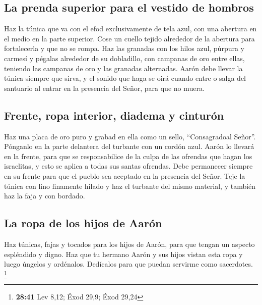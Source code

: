 \hypertarget{la-prenda-superior-para-el-vestido-de-hombros}{%
\subsection{La prenda superior para el vestido de
hombros}\label{la-prenda-superior-para-el-vestido-de-hombros}}

 Haz la túnica que va con el efod exclusivamente de tela
azul,  con una abertura en el medio en la parte superior.
Cose un cuello tejido alrededor de la abertura para fortalecerla y que
no se rompa.  Haz las granadas con los hilos azul,
púrpura y carmesí y pégalas alrededor de su dobladillo, con campanas de
oro entre ellas,  teniendo las campanas de oro y las
granadas alternadas.  Aarón debe llevar la túnica siempre
que sirva, y el sonido que haga se oirá cuando entre o salga del
santuario al entrar en la presencia del Señor, para que no muera.

\hypertarget{frente-ropa-interior-diadema-y-cinturuxf3n}{%
\subsection{Frente, ropa interior, diadema y
cinturón}\label{frente-ropa-interior-diadema-y-cinturuxf3n}}

 Haz una placa de oro puro y grabad en ella como un
sello, ``Consagradoal Señor''.  Pónganlo en la parte
delantera del turbante con un cordón azul.  Aarón lo
llevará en la frente, para que se responsabilice de la culpa de las
ofrendas que hagan los israelitas, y esto se aplica a todas sus santas
ofrendas. Debe permanecer siempre en su frente para que el pueblo sea
aceptado en la presencia del Señor.  Teje la túnica con
lino finamente hilado y haz el turbante del mismo material, y también
haz la faja y con bordado.

\hypertarget{la-ropa-de-los-hijos-de-aaruxf3n}{%
\subsection{La ropa de los hijos de
Aarón}\label{la-ropa-de-los-hijos-de-aaruxf3n}}

 Haz túnicas, fajas y tocados para los hijos de Aarón,
para que tengan un aspecto espléndido y digno.  Haz que
tu hermano Aarón y sus hijos vistan esta ropa y luego úngelos y
ordénalos. Dedícalos para que puedan servirme como sacerdotes.
\footnote{\textbf{28:41} Lev 8,12; Éxod 29,9; Éxod 29,24}

